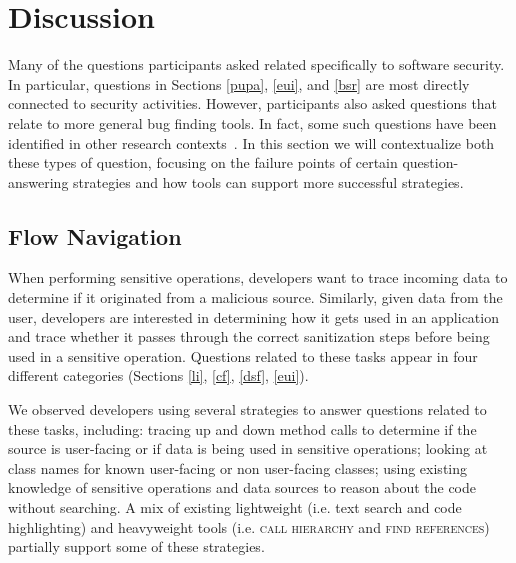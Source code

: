 \documentclass{acm_proc_article-sp}
\begin{document}
\section{Discussion}
Many of the questions participants asked related specifically to software security. 
In particular, questions in Sections \ref{pupa}, \ref{eui}, and \ref{bsr} are most directly connected to security activities. 
However, participants also asked questions that relate to more general bug finding tools.
In fact, some such questions have been identified in other research contexts~\cite{latoza2010hard}. In this section we will contextualize both these types of question, focusing on the failure points of certain question-answering strategies and how tools can support more successful strategies.

\subsection{Flow Navigation}
When performing sensitive operations, developers want to trace incoming data to determine if it originated from a malicious source. 
Similarly, given data from the user, developers are interested in determining how it gets used in an application and trace whether it passes through the correct sanitization steps before being used in a sensitive operation. Questions related to these tasks appear in four different categories (Sections \ref{li}, \ref{cf}, \ref{dsf}, \ref{eui}).

We observed developers using several strategies to answer questions related to these tasks, including: tracing up and down method calls to determine if the source is user-facing or if data is being used in sensitive operations; looking at class names for known user-facing or non user-facing classes; using existing knowledge of sensitive operations and data sources to reason about the code without searching. A mix of existing lightweight (i.e. text search and code highlighting) and heavyweight tools (i.e. \textsc{call hierarchy} and \textsc{find references}) partially support some of these strategies. 
\end{document}
